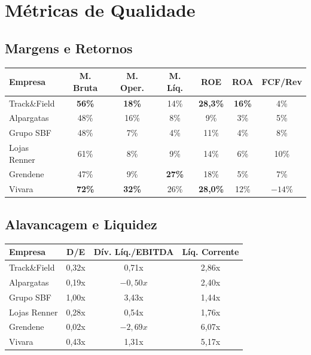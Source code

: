 \documentclass[12pt, a4paper]{article}
\begin{document}
\section{Métricas de Qualidade}

\subsection{Margens e Retornos}

\begin{center}
\small
\begin{tabular}{lcccccc}
\toprule
\textbf{Empresa} & \textbf{M. Bruta} & \textbf{M. Oper.} & \textbf{M. Líq.} & \textbf{ROE} & \textbf{ROA} & \textbf{FCF/Rev} \\
\midrule
\rowcolor{cinzatabela}
Track\&Field & \textbf{56\%} & \textbf{18\%} & 14\% & \textcolor{verdepositivo}{\textbf{28,3\%}} & \textbf{16\%} & 4\% \\
Alpargatas & 48\% & 16\% & 8\% & 9\% & 3\% & 5\% \\
\rowcolor{cinzatabela}
Grupo SBF & 48\% & 7\% & 4\% & 11\% & 4\% & 8\% \\
Lojas Renner & 61\% & 8\% & 9\% & 14\% & 6\% & 10\% \\
\rowcolor{cinzatabela}
Grendene & 47\% & 9\% & \textbf{27\%} & 18\% & 5\% & 7\% \\
Vivara & \textbf{72\%} & \textbf{32\%} & 26\% & \textcolor{verdepositivo}{\textbf{28,0\%}} & 12\% & $-14\%$ \\
\bottomrule
\end{tabular}
\end{center}

\subsection{Alavancagem e Liquidez}

\begin{center}
\begin{tabular}{lccc}
\toprule
\textbf{Empresa} & \textbf{D/E} & \textbf{Dív. Líq./EBITDA} & \textbf{Líq. Corrente} \\
\midrule
\rowcolor{cinzatabela}
Track\&Field & 0,32x & 0,71x & 2,86x \\
Alpargatas & 0,19x & $-0,50x$ & 2,40x \\
\rowcolor{cinzatabela}
Grupo SBF & 1,00x & 3,43x & 1,44x \\
Lojas Renner & 0,28x & 0,54x & 1,76x \\
\rowcolor{cinzatabela}
Grendene & 0,02x & $-2,69x$ & 6,07x \\
Vivara & 0,43x & 1,31x & 5,17x \\
\bottomrule
\end{tabular}
\end{center}
\end{document}
